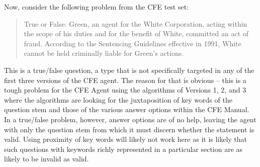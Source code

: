 Now, consider the following problem from the CFE test set:

\blockquote{True or False: Green, an agent for the White Corporation, acting within the scope of his duties and for the benefit of White, committed an act of fraud. According to the Sentencing Guidelines effective in 1991, White cannot be held criminally liable for Green's actions. \cite{acfe_study_package_2011}}

This is a true/false question, a type that is not specifically targeted in any of the first three versions of the CFE agent. The reason for that is obvious – this is a tough problem for the CFE Agent using the algorithms of Versions 1, 2, and 3 where the algorithms are looking for the juxtaposition of key words of the question stem and those of the various answer options within the CFE Manual. In a true/false problem, however, answer options are of no help, leaving the agent with only the question stem from which it must discern whether the statement is valid.  Using proximity of key words will likely not work here as it is likely that such questions with keywords richly represented in a particular section are as likely to be invalid as valid. 

